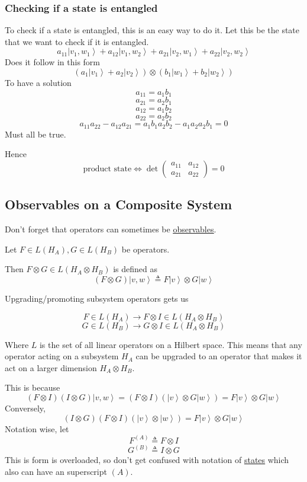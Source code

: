 \documentclass[
]{article}
\let\oldhyperref\hyperref
\renewcommand{\hyperref}[2][]{\oldhyperref[#1]{\underline{#2}}}
\providecommand{\ket}[1]{\left\lvert #1 \right\rangle}
\providecommand{\rarr}{\rightarrow}
\begin{document}
\subsubsection{Checking if a state is entangled}\label{checking-if-a-state-is-entangled}
To check if a state is entangled, this is an easy way to do it.
Let this be the state that we want to check if it is entangled.
\[
	a_{11}\ket{v_1,w_1}+a_{12}\ket{v_1, w_2}+a_{21}\ket{v_2, w_1} + a_{22}\ket{v_2, w_2}
\]
Does it follow in this form
\[
	(a_1\ket{v_1}+a_2\ket{v_2})\otimes(b_1\ket{w_1}+b_2\ket{w_2})
\]
To have a solution
\[
	a_{11} = a_1b_1
\]
\[
	a_{21} = a_2b_1
\]
\[
	a_{12} = a_1b_2
\]
\[
	a_{22} = a_2b_2
\]
\[
	a_{11}a_{22}-a_{12}a_{21}=a_1b_1a_2b_2-a_1a_2a_2b_1=0
\]
Must all be true.

Hence
\[\text{product state} \Leftrightarrow \det\begin{pmatrix} a_{11} & a_{12} \\ a_{21} & a_{22} \end{pmatrix}=0\]


\subsection{Observables on a Composite System}\label{operators-in-tensor-product-space}
Don't forget that operators can sometimes be \hyperref[observables]{observables}.

Let $F\in L(H_A), G \in L (H_B)$ be operators.

Then $F\otimes G \in L(H_A\otimes H_B)$ is defined as
\[
	(F\otimes G)\ket{v, w} \triangleq F\ket{v}\otimes G\ket{w}
\]

Upgrading/promoting subsystem operators gets us

\[
	F\in L(H_A)\rarr F\otimes I \in L(H_A\otimes H_B)
\]
\[
	G\in L(H_B)\rarr G\otimes I \in L(H_A\otimes H_B)
\]

Where $L$ is the set of all linear operators on a Hilbert space.
This means that any operator acting on a subsystem $H_A$ can be upgraded to an operator that makes it act on a larger dimension $H_A\otimes H_B$.

This is because
\[
	(F\otimes I)(I \otimes G)\ket{v, w} =(F\otimes I)(\ket{v}\otimes G\ket{w}) = F\ket{v}\otimes G\ket{w}
\]
Conversely,
\[
	(I\otimes G)(F\otimes I)(\ket{v}\otimes \ket{w})=F\ket{v}\otimes G\ket{w}
\]
Notation wise, let
\[
	F^{(A)}\triangleq F\otimes I
\]
\[
	G^{(B)}\triangleq I\otimes G
\]
This is form is overloaded, so don't get confused with notation of \hyperref[states-on-a-composite-system]{states} which also can have an superscript $(A)$.
\end{document}
